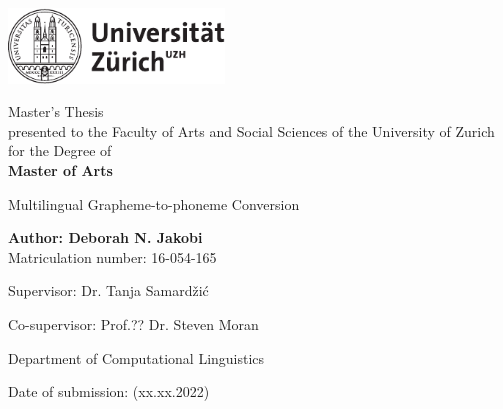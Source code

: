 \begin{titlepage}
\includegraphics[height=20mm]{images/uzh_logo_d_pos}\\

\begin{center}

{\sffamily
Master's Thesis \\
presented to the Faculty of Arts and Social Sciences of the University of Zurich for the Degree of \\
\textbf{Master of Arts} \\

\vspace{2cm}

{\Huge Multilingual Grapheme-to-phoneme Conversion}\\

\vspace{4cm}

\textbf{Author: Deborah N. Jakobi} \\
	Matriculation number: 16-054-165 \\

\vspace{2cm}

Supervisor: Dr. Tanja Samardžić 

Co-supervisor: Prof.?? Dr. Steven Moran 

Department of Computational Linguistics

\vfill Date of submission: (xx.xx.2022)

\vspace{3cm}
}
\end{center}

\end{titlepage}

\newpage
